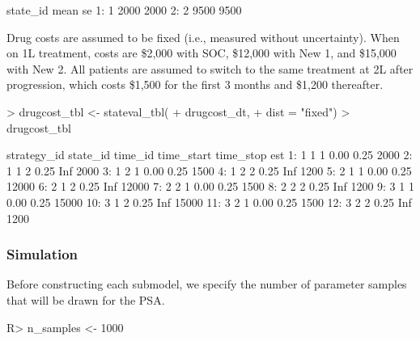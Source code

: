 \documentclass[article, nojss]{jss}\usepackage[]{graphicx}\usepackage[]{color}
\begin{document}
\begin{Schunk}
\begin{Soutput}
   state_id mean   se
1:        1 2000 2000
2:        2 9500 9500
\end{Soutput}
\end{Schunk}

Drug costs are assumed to be fixed (i.e., measured without uncertainty). When on 1L treatment, costs are \$2,000 with SOC, \$12,000 with New 1, and \$15,000 with New 2. All patients are assumed to switch to the same treatment at 2L after progression, which costs \$1,500 for the first 3 months and \$1,200 thereafter.



\begin{Schunk}
\begin{Sinput}
> drugcost_tbl <- stateval_tbl(
+   drugcost_dt,
+   dist = "fixed")
> drugcost_tbl
\end{Sinput}
\begin{Soutput}
    strategy_id state_id time_id time_start time_stop   est
 1:           1        1       1       0.00      0.25  2000
 2:           1        1       2       0.25       Inf  2000
 3:           1        2       1       0.00      0.25  1500
 4:           1        2       2       0.25       Inf  1200
 5:           2        1       1       0.00      0.25 12000
 6:           2        1       2       0.25       Inf 12000
 7:           2        2       1       0.00      0.25  1500
 8:           2        2       2       0.25       Inf  1200
 9:           3        1       1       0.00      0.25 15000
10:           3        1       2       0.25       Inf 15000
11:           3        2       1       0.00      0.25  1500
12:           3        2       2       0.25       Inf  1200
\end{Soutput}
\end{Schunk}

\subsubsection{Simulation}
Before constructing each submodel, we specify the number of parameter samples that will be drawn for the PSA.

\begin{Schunk}
\begin{Sinput}
R> n_samples <- 1000
\end{Sinput}
\end{Schunk}
\end{document}

